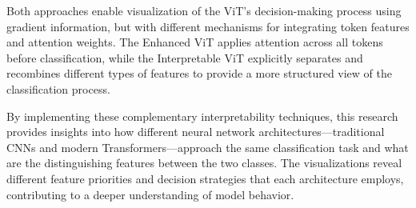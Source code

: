 \documentclass[a4paper,12pt]{report}
\begin{document}
Both approaches enable visualization of the ViT's decision-making process using gradient information, but with different mechanisms for integrating token features and attention weights. The Enhanced ViT applies attention across all tokens before classification, while the Interpretable ViT explicitly separates and recombines different types of features to provide a more structured view of the classification process.

By implementing these complementary interpretability techniques, this research provides insights into how different neural network architectures—traditional CNNs and modern Transformers—approach the same classification task and what are the distinguishing features between the two classes. The visualizations reveal different feature priorities and decision strategies that each architecture employs, contributing to a deeper understanding of model behavior.


    
    





\end{document}

